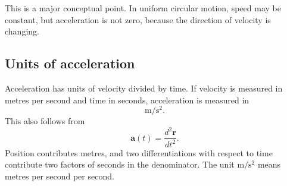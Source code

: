This is a major conceptual point. In uniform circular motion, speed may be constant, but acceleration is not zero, because the direction of velocity is changing.

\subsection{Units of acceleration}

Acceleration has units of velocity divided by time. If velocity is measured in metres per second and time in seconds, acceleration is measured in
\[
\mathrm{m/s^2}.
\]
This also follows from
\[
\mathbf{a}(t)=\frac{d^2\mathbf{r}}{dt^2}.
\]
Position contributes metres, and two differentiations with respect to time contribute two factors of seconds in the denominator. The unit \(\mathrm{m/s^2}\) means metres per second per second.
